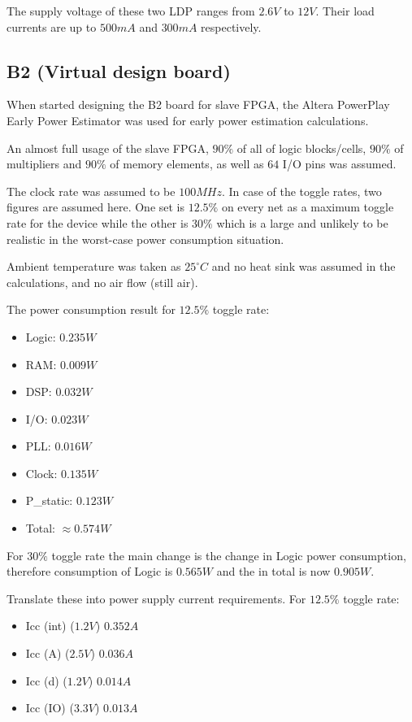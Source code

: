 The supply voltage of these two LDP ranges from $2.6V$ to $12V$. Their load currents are up to $500mA$ and $300mA$ respectively.


\newpage
\subsection{B2 (Virtual design board)}

When started designing the B2 board for slave FPGA, the Altera PowerPlay Early Power Estimator was
used for early power estimation calculations.

An almost full usage of the slave FPGA, $90\%$ of all of logic blocks/cells,
$90\%$ of multipliers and $90\%$ of memory elements, as well as $64$ I/O pins was assumed.

The clock rate was assumed to be $100MHz$. In case of the toggle rates, two figures are assumed here.
One set is $12.5\%$ on every net as a maximum toggle rate for the device while the
other is $30\%$ which is a large and unlikely to be realistic in the worst-case power consumption situation.

Ambient temperature was taken as $25^{\circ} C$ and no heat sink was assumed in the calculations, and no air flow (still air).

The power consumption result for $12.5\%$ toggle rate:
\begin{itemize}
 \item Logic: $0.235 W$
 \item RAM: $0.009 W$
 \item DSP: $0.032W$
 \item I/O: $0.023 W$
 \item PLL: $0.016 W$
 \item Clock: $0.135W$
 \item P\_static: $0.123W$
 \item Total: $\approx0.574 W$
\end{itemize}
For $30\%$ toggle rate the main change is the change in Logic power consumption, therefore consumption of Logic is $0.565 W$ and the in total is now $0.905 W$.

Translate these into power supply current requirements. For $12.5\%$ toggle rate:
\begin{itemize}
 \item Icc (int) ($1.2V$) $0.352A$
 \item Icc (A) ($2.5V$) $0.036A$
 \item Icc (d) ($1.2V$) $0.014A$
 \item Icc (IO) ($3.3V$) $0.013A$
\end{itemize}

